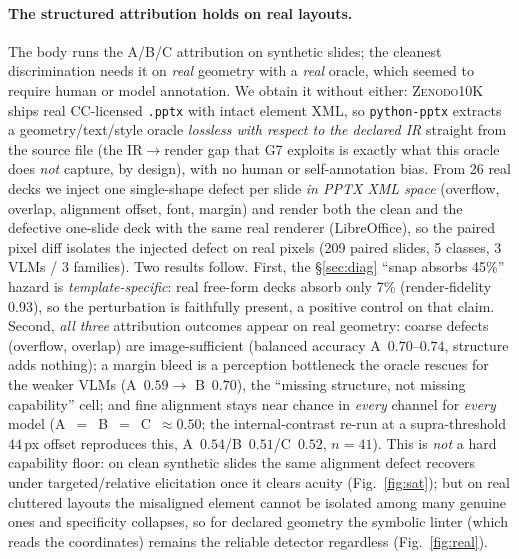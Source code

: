 \documentclass[10pt]{article}
\newcommand{\g}[1]{\textsf{#1}}        %
\begin{document}
\paragraph{The structured attribution holds on real layouts.}
The body runs the A/B/C attribution on synthetic slides; the cleanest discrimination needs it on \emph{real}
geometry with a \emph{real} oracle, which seemed to require human or model annotation. We obtain it without either:
\textsc{Zenodo10K}~\cite{zenodo10k} ships real CC-licensed \texttt{.pptx} with intact element XML, so
\texttt{python-pptx} extracts a geometry/text/style oracle \emph{lossless with respect to the declared IR}
straight from the source file (the IR$\to$render gap that \g{G7} exploits is exactly what this oracle does
\emph{not} capture, by design), with no human or self-annotation bias. From 26 real decks we inject one single-shape defect per slide
\emph{in PPTX XML space} (overflow, overlap, alignment offset, font, margin) and render both the clean and the
defective one-slide deck with the same real renderer (LibreOffice), so the paired pixel diff isolates the injected
defect on real pixels (209 paired slides, 5 classes, 3 VLMs / 3 families). Two results follow. First, the
\S\ref{sec:diag} ``snap absorbs 45\%'' hazard is \emph{template-specific}: real free-form decks absorb only
7\% (render-fidelity 0.93), so the perturbation is faithfully present, a positive control on that claim.
Second, \emph{all three} attribution outcomes appear on real geometry: coarse defects (overflow, overlap) are
image-sufficient (balanced accuracy A~$0.70$--$0.74$, structure adds nothing); a margin bleed is a
perception bottleneck the oracle rescues for the weaker VLMs (A~$0.59 \to$ B~$0.70$), the
``missing structure, not missing capability'' cell; and fine alignment stays near chance in \emph{every}
channel for \emph{every} model (A~$=$~B~$=$~C~$\approx 0.50$; the internal-contrast re-run at a supra-threshold
$44$\,px offset reproduces this, A~$0.54$/B~$0.51$/C~$0.52$, $n{=}41$). This is \emph{not} a hard capability
floor: on clean synthetic slides the same alignment defect recovers under targeted/relative elicitation once it
clears acuity (Fig.~\ref{fig:sat}); but on real cluttered layouts the misaligned element cannot be isolated
among many genuine ones and specificity collapses, so for declared geometry the symbolic linter (which reads the
coordinates) remains the reliable detector regardless (Fig.~\ref{fig:real}).
\end{document}
